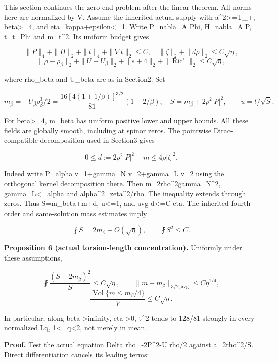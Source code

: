 \documentclass[
  10pt,
]{article}
\begin{document}
This section continues the zero-end problem after the linear theorem.
All norms here are normalized by V. Assume the inherited actual supply
with a\^{}2\textgreater=T\_+, beta\textgreater=4, and
eta=kappa+epsilon\textless=1. Write P=nabla\_A Phi, H=nabla\_A P,
t=t\_Phi and m=\textbar t\textbar\^{}2. Its uniform budget gives

\[
 \|P\|_4+\|H\|_2+\|t\|_4+\|\nabla t\|_2\le C,\quad
 \|\zeta\|_2+\|d\rho\|_2\le C\sqrt\eta,
\] \[
 \|\rho-\rho_\beta\|_2+\|U-U_\beta\|_2
 +\|s+4\|_2+\|\operatorname{Ric}^{\circ}\|_2\le C\sqrt\eta,
\]

where rho\_beta and U\_beta are as in Section2. Set

\[
 m_\beta=-U_\beta\rho_\beta^3/2
 =\frac{16[4(1+1/\beta)]^{3/2}}{81}(1-2/\beta),\quad
 S=m_\beta+2\rho^2|P|^2,\qquad u=t/\sqrt S.            \tag{8.1}
\]

For beta\textgreater=4, m\_beta has uniform positive lower and upper
bounds. All these fields are globally smooth, including at spinor zeros.
The pointwise Dirac-compatible decomposition used in Section3 gives

\[
       0\le d:=2\rho^2|P|^2-m\le4\rho|\zeta|^2.      \tag{8.2}
\]

Indeed write P=alpha v\_1+gamma\_N v\_2+gamma\_L v\_2 using the
orthogonal kernel decomposition there. Then
m=2rho\^{}2\textbar gamma\_N\textbar\^{}2,
\textbar gamma\_L\textbar\textless=\textbar alpha\textbar{} and
\textbar alpha\textbar\^{}2=\textbar zeta\textbar\^{}2/rho. The
inequality extends through zeros. Thus S=m\_beta+m+d,
\textbar u\textbar\textless=1, and avg d\textless=C eta. The inherited
fourth-order and same-solution mass estimates imply

\[
 \fint S=2m_\beta+O(\sqrt\eta),\qquad \fint S^2\le C. \tag{8.3}
\]

\textbf{Proposition 6 (actual torsion-length concentration).} Uniformly
under these assumptions,

\[
 \fint\frac{(S-2m_\beta)^2}{S}\le C\sqrt\eta,\qquad
 \|m-m_\beta\|_{3/2,\mathrm{avg}}\le C\eta^{1/4},
                                                               \tag{8.4}
\] \[
 \frac{\operatorname{Vol}\{m\le m_\beta/4\}}V
                                      \le C\sqrt\eta. \tag{8.5}
\]

In particular, along beta-\textgreater infinity, eta-\textgreater0,
\textbar t\textbar\^{}2 tends to 128/81 strongly in every normalized Lq,
1\textless=q\textless2, not merely in mean.

\textbf{Proof.} Test the actual equation Delta
rho=-2\textbar P\textbar\^{}2-U rho/2 against a=2rho\^{}2/S. Direct
differentiation cancels its leading terms:
\end{document}
